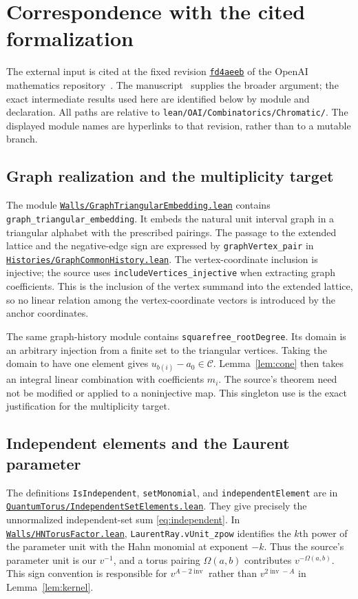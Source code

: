 \documentclass[11pt,reqno]{amsart}
\newcommand{\CC}{\mathscr C}
\newcommand{\inv}{\operatorname{inv}}
\newcommand{\sourcefile}[2]{\href{https://github.com/openai/math/blob/fd4aeeb/lean/OAI/Combinatorics/Chromatic/#1}{\nolinkurl{#2}}}
\newcommand{\decl}[1]{\nolinkurl{#1}}
\theoremstyle{definition}
\theoremstyle{remark}
\numberwithin{equation}{section}
\begin{document}
\appendix
\section{Correspondence with the cited formalization}\label{app:sources}

The external input is cited at the fixed revision
\href{https://github.com/openai/math/commit/fd4aeeb}{\texttt{fd4aeeb}}
of the OpenAI mathematics repository~\cite{OpenAILean2026}.
The manuscript~\cite{OpenAI2026} supplies the
broader argument; the exact intermediate results used here are
identified below by module and declaration.  All paths are relative
to \nolinkurl{lean/OAI/Combinatorics/Chromatic/}.  The displayed module
names are hyperlinks to that revision, rather than to a mutable
branch.

\subsection{Graph realization and the multiplicity target}
The module
\sourcefile{Walls/GraphTriangularEmbedding.lean}{Walls/GraphTriangularEmbedding.lean}
contains \decl{graph_triangular_embedding}.  It embeds the natural
unit interval graph in a triangular alphabet with the prescribed
pairings.  The passage to the extended lattice and the negative-edge
sign are expressed by \decl{graphVertex_pair} in
\sourcefile{Histories/GraphCommonHistory.lean}{Histories/GraphCommonHistory.lean}.
The vertex-coordinate inclusion is injective; the source uses
\decl{includeVertices_injective} when extracting graph coefficients.
This is the inclusion of the vertex summand into the extended lattice,
so no linear relation among the vertex-coordinate vectors is introduced
by the anchor coordinates.

The same graph-history module contains \decl{squarefree_rootDegree}.
Its domain is an arbitrary injection from a finite set to the
triangular vertices.  Taking the domain to have one element gives
$u_{b(i)}-a_0\in\CC$.  Lemma~\ref{lem:cone} then takes an integral
linear combination with coefficients $m_i$.  The source's theorem
need not be modified or applied to a noninjective map.  This singleton
use is the exact justification for the multiplicity target.

\subsection{Independent elements and the Laurent parameter}
The definitions \decl{IsIndependent}, \decl{setMonomial}, and
\decl{independentElement} are in
\sourcefile{QuantumTorus/IndependentSetElements.lean}{QuantumTorus/IndependentSetElements.lean}.
They give precisely the unnormalized independent-set sum
\eqref{eq:independent}.  In
\sourcefile{Walls/HNTorusFactor.lean}{Walls/HNTorusFactor.lean},
\decl{LaurentRay.vUnit_zpow} identifies the $k$th power of the
parameter unit with the Hahn monomial at exponent $-k$.
Thus the source's parameter unit is our $v^{-1}$, and a torus pairing
$\Omega(a,b)$ contributes $v^{-\Omega(a,b)}$.  This sign convention
is responsible for $v^{A-2\inv}$ rather than $v^{2\inv-A}$ in
Lemma~\ref{lem:kernel}.
\end{document}
